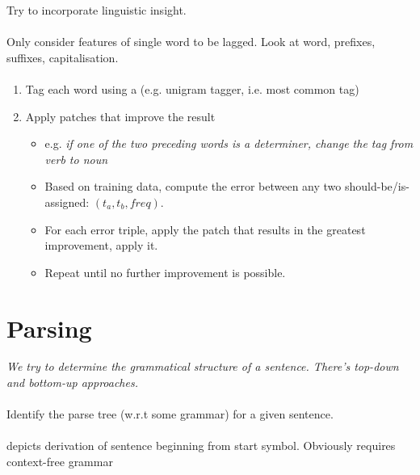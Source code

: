 \documentclass[10pt,twocolumn]{article}
\begin{document}
Try to incorporate linguistic insight.

\paragraph{ } Only consider features of single word to
be lagged. Look at word, prefixes, suffixes, capitalisation.

\paragraph{ }
\begin{enumerate}
\item Tag each word using a  (e.g. unigram tagger, i.e.
  most common tag)
\item Apply patches that improve the result
  \begin{itemize}
  \item e.g. \textit{if one of the two preceding words is a determiner, change
      the tag from verb to noun}
  \item Based on training data, compute the error between any two
    should-be/is-assigned: $(t_a, t_b, \mathit{freq})$.
  \item For each error triple, apply the patch that results in the greatest
    improvement, apply it.
  \item Repeat until no further improvement is possible.
  \end{itemize}
\end{enumerate}



\section{Parsing}

\textit{We try to determine the grammatical structure of a sentence. There's
  top-down and bottom-up approaches.}

\paragraph{} Identify the parse tree (w.r.t some grammar)
for a given sentence. 

\paragraph{} depicts derivation of sentence beginning from start
symbol. Obviously requires context-free grammar 
\end{document}
